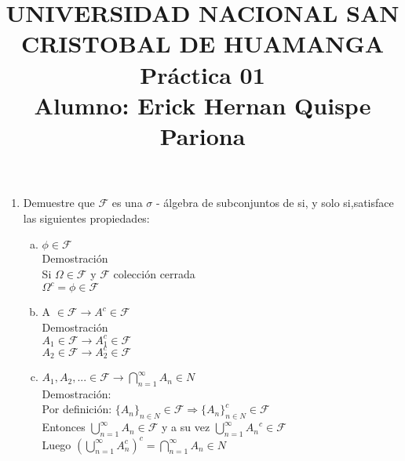\documentclass[12pt]{article}
\title{\textbf{
UNIVERSIDAD NACIONAL SAN CRISTOBAL DE HUAMANGA \\Práctica 01\\Alumno: Erick Hernan Quispe Pariona }}
\date{}
\begin{document}
\maketitle
\begin{enumerate}
\item  Demuestre que $\mathcal{F}$ es una $\sigma$ - álgebra de subconjuntos de si, y solo si,satisface las siguientes propiedades:
\begin{enumerate}[a)]

\item $\phi \in \mathcal{F}$\\[0.2cm]
Demostración\\[0.2cm]
Si $\Omega \in \mathcal{F}$ y $ \mathcal{F}$ colección cerrada\\[0.2cm]
$\Omega^c = \phi\in\mathcal{F}$\\[0.2cm]

\item A $\in \mathcal{F}\longrightarrow A^{c} \in\mathcal{F}$\\[0.2cm]
Demostración\\[0.2cm]
$A_1\in \mathcal{F} \longrightarrow {A_1^c} \in \mathcal{F} $\\[0.2cm]
$A_2\in \mathcal{F} \longrightarrow {A_2^c} \in \mathcal{F} $\\[0.2cm]


\item $A_1,A_2,... \in \mathcal{F} \longrightarrow\displaystyle\bigcap_{n=1}^{\infty}{A_n \in N}$\\[0.2cm]
Demostración:\\[0.2cm]
Por definición: $\{A_n\}_{n \in N} \in \mathcal{F} \Rightarrow \{A_n\}^c_{n \in N}\in \mathcal{F}$\\[0.2cm]
Entonces $\displaystyle\bigcup_{n=1}^{\infty}{A_n}\in \mathcal{F}$ y a su vez $\displaystyle\bigcup_{n=1}^{\infty}{A_n}^c\in \mathcal{F}$\\[0.2cm]
Luego $\left(\displaystyle\bigcup_{n=1}^{\infty}{A_n^c}\right)^c = \displaystyle\bigcap_{n=1}^{\infty}{A_n \in N}$

\end{enumerate}


\end{enumerate}
\end{document}
